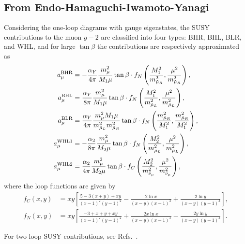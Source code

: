 \documentclass[a4paper,10pt,captions=tableheading,DIV=14]{scrartcl}
\numberwithin{equation}{section}
\newcommand\amu[1][\relax]{\ifx#1\relax{a_\mu}\else{a_\mu^{\mathrm{#1}}}\fi}
\begin{document}
\subsection{From Endo-Hamaguchi-Iwamoto-Yanagi}
Considering the one-loop diagrams with gauge eigenstates, the SUSY contributions to the muon $g-2$ are classified into four types: BHR, BHL, BLR, and WHL, and for large $\tan\beta$ the contributions are respectively approximated as~\cite{Moroi:1995yh}
\begin{align}
  \amu[BHR]
  &= - \frac{\alpha_Y}{4\pi} \frac{m_{\mu}^2}{M_1\mu} \tan\beta\cdot
    f_N\left(\frac{M_1^2}{m_{\tilde{\mu}_R}^2}, \frac{\mu^2}{m_{\tilde{\mu}_R}^2} \right),
    \label{eq:BHR} \\
  \amu[BHL]
  &= \frac{\alpha_Y}{8\pi} \frac{m_{\mu}^2}{M_1\mu} \tan\beta\cdot
    f_N\left(\frac{M_1^2}{m_{\tilde{\mu}_L}^2}, \frac{\mu^2}{m_{\tilde{\mu}_L}^2} \right),
    \label{eq:BHL}\\
  \amu[BLR]
  &= \frac{\alpha_Y}{4\pi} \frac{m_{\mu}^2M_1\mu}{m_{\tilde{\mu}_L}^2m_{\tilde{\mu}_R}^2}
    \tan\beta\cdot
    f_N\left(\frac{m_{\tilde{\mu}_R}^2}{M_1^2}, \frac{m_{\tilde{\mu}_R}^2}{M_1^2} \right),
    \label{eq:BLR} \\
  \amu[WHL1]
  &= -\frac{\alpha_2}{8\pi} \frac{m_{\mu}^2}{M_2\mu} \tan\beta\cdot
    f_N\left(\frac{M_2^2}{m_{\tilde{\mu}_L}^2}, \frac{\mu^2}{m_{\tilde{\mu}_L}^2} \right),
    \label{eq:WHL1}\\
  \amu[WHL2]
  &= \frac{\alpha_2}{4\pi} \frac{m_{\mu}^2}{M_2\mu} \tan\beta\cdot
    f_C\left(\frac{M_2^2}{m_{\tilde{\nu}_{\mu}}^2}, \frac{\mu^2}{m_{\tilde{\nu}_{\mu}}^2} \right),
    \label{eq:WHL2}
\end{align}
where the loop functions are given by
\begin{align}
    \label{eq:loop-aprox}
    f_C(x,y)
    &=xy\left[
      \frac{5-3(x+y)+xy}{(x-1)^2(y-1)^2} - \frac{2\ln x}{(x-y)(x-1)^3}+\frac{2\ln y}{(x-y)(y-1)^3}
      \right],
    \\
    f_N(x,y)
    &= xy\left[
      \frac{-3+x+y+xy}{(x-1)^2(y-1)^2} + \frac{2x\ln x}{(x-y)(x-1)^3}-\frac{2y\ln y}{(x-y)(y-1)^3}
      \right].
\end{align}

For two-loop SUSY contributions, see Refs.~\cite{Fargnoli:2013zda,Fargnoli:2013zia,Athron:2015rva}.
\end{document}
